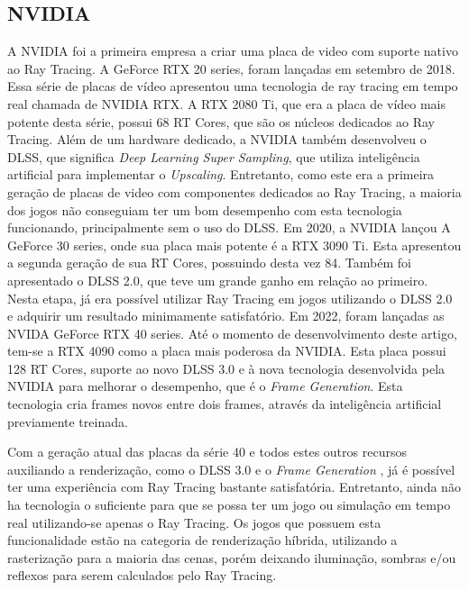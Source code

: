 \documentclass[journal]{IEEEtran}
\begin{document}
\subsection{NVIDIA}

A NVIDIA foi a primeira empresa a criar uma placa de video com suporte nativo ao
Ray Tracing. A GeForce RTX 20 series, foram lançadas em setembro de 2018. Essa 
série de placas de vídeo apresentou uma tecnologia de ray tracing em tempo real 
chamada de NVIDIA RTX. A RTX 2080 Ti, que era a placa de vídeo mais potente
desta série, possui 68 RT Cores, que são os núcleos dedicados ao Ray Tracing.
Além de um hardware dedicado, a NVIDIA também desenvolveu o DLSS, que significa
\emph{Deep Learning Super Sampling}, que utiliza inteligência artificial para
implementar o \emph{Upscaling}. Entretanto, como este era a primeira geração
de placas de video com componentes dedicados ao Ray Tracing, a maioria dos
jogos não conseguiam ter um bom desempenho com esta tecnologia funcionando,
principalmente sem o uso do DLSS. Em 2020, a NVIDIA lançou A GeForce 30
series, onde sua placa mais potente é a RTX 3090 Ti. Esta apresentou a
segunda geração de sua RT Cores, possuindo desta vez 84. Também foi apresentado
o DLSS 2.0, que teve um grande ganho em relação ao primeiro. Nesta etapa,
já era possível utilizar Ray Tracing em jogos utilizando o DLSS 2.0 e
adquirir um resultado minimamente satisfatório. Em 2022, foram lançadas as
NVIDA GeForce RTX 40 series. Até o momento de desenvolvimento deste artigo,
tem-se a RTX 4090 como a placa mais poderosa da NVIDIA. Esta placa possui
128 RT Cores, suporte ao novo DLSS 3.0 e à nova tecnologia desenvolvida
pela NVIDIA para melhorar o desempenho, que é o \emph{Frame Generation}.
Esta tecnologia cria frames novos entre dois frames, através da inteligência
artificial previamente treinada. 

Com a geração atual das placas da série 40 e todos estes outros recursos auxiliando
a renderização, como o DLSS 3.0 e o \emph{Frame Generation} \cite{c15}, já é possível
ter uma experiência com Ray Tracing bastante satisfatória. Entretanto, ainda não ha 
tecnologia o suficiente para que se possa ter um jogo ou simulação em
tempo real utilizando-se apenas o Ray Tracing. Os jogos que possuem esta
funcionalidade estão na categoria de renderização híbrida, utilizando a
rasterização para a maioria das cenas, porém deixando iluminação, sombras e/ou
reflexos para serem calculados pelo Ray Tracing.
\end{document}

